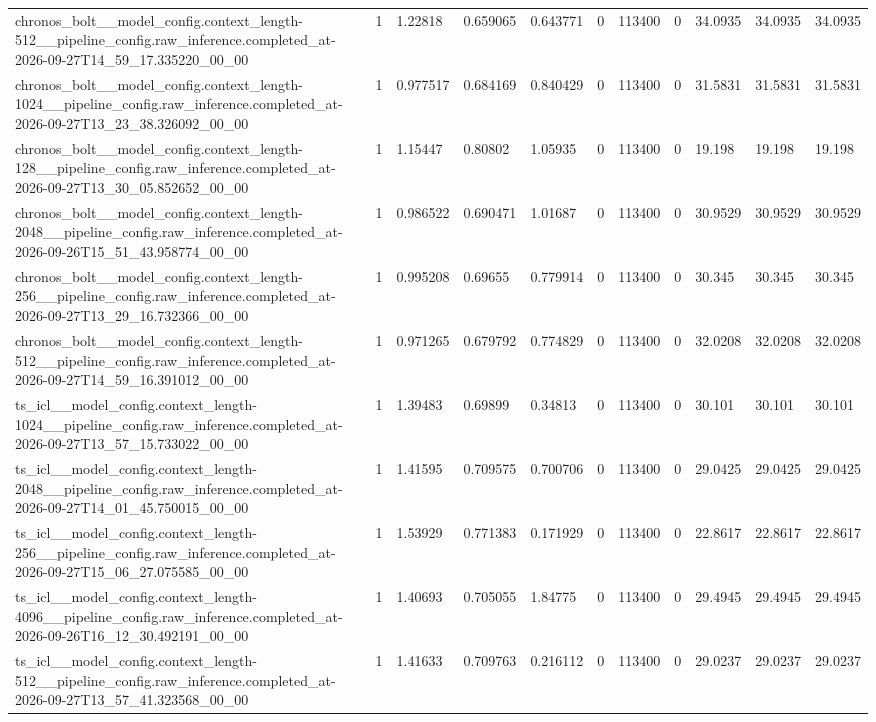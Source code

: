 \begin{tabular}{lllllllllll}
chronos\_bolt\_\_model\_config.context\_length-512\_\_pipeline\_config.raw\_inference.completed\_at-2026-09-27T14\_59\_17.335220\_00\_00 & 1 & 1.22818 & 0.659065 & 0.643771 & 0 & 113400 & 0 & 34.0935 & 34.0935 & 34.0935 \\
chronos\_bolt\_\_model\_config.context\_length-1024\_\_pipeline\_config.raw\_inference.completed\_at-2026-09-27T13\_23\_38.326092\_00\_00 & 1 & 0.977517 & 0.684169 & 0.840429 & 0 & 113400 & 0 & 31.5831 & 31.5831 & 31.5831 \\
chronos\_bolt\_\_model\_config.context\_length-128\_\_pipeline\_config.raw\_inference.completed\_at-2026-09-27T13\_30\_05.852652\_00\_00 & 1 & 1.15447 & 0.80802 & 1.05935 & 0 & 113400 & 0 & 19.198 & 19.198 & 19.198 \\
chronos\_bolt\_\_model\_config.context\_length-2048\_\_pipeline\_config.raw\_inference.completed\_at-2026-09-26T15\_51\_43.958774\_00\_00 & 1 & 0.986522 & 0.690471 & 1.01687 & 0 & 113400 & 0 & 30.9529 & 30.9529 & 30.9529 \\
chronos\_bolt\_\_model\_config.context\_length-256\_\_pipeline\_config.raw\_inference.completed\_at-2026-09-27T13\_29\_16.732366\_00\_00 & 1 & 0.995208 & 0.69655 & 0.779914 & 0 & 113400 & 0 & 30.345 & 30.345 & 30.345 \\
chronos\_bolt\_\_model\_config.context\_length-512\_\_pipeline\_config.raw\_inference.completed\_at-2026-09-27T14\_59\_16.391012\_00\_00 & 1 & 0.971265 & 0.679792 & 0.774829 & 0 & 113400 & 0 & 32.0208 & 32.0208 & 32.0208 \\
ts\_icl\_\_model\_config.context\_length-1024\_\_pipeline\_config.raw\_inference.completed\_at-2026-09-27T13\_57\_15.733022\_00\_00 & 1 & 1.39483 & 0.69899 & 0.34813 & 0 & 113400 & 0 & 30.101 & 30.101 & 30.101 \\
ts\_icl\_\_model\_config.context\_length-2048\_\_pipeline\_config.raw\_inference.completed\_at-2026-09-27T14\_01\_45.750015\_00\_00 & 1 & 1.41595 & 0.709575 & 0.700706 & 0 & 113400 & 0 & 29.0425 & 29.0425 & 29.0425 \\
ts\_icl\_\_model\_config.context\_length-256\_\_pipeline\_config.raw\_inference.completed\_at-2026-09-27T15\_06\_27.075585\_00\_00 & 1 & 1.53929 & 0.771383 & 0.171929 & 0 & 113400 & 0 & 22.8617 & 22.8617 & 22.8617 \\
ts\_icl\_\_model\_config.context\_length-4096\_\_pipeline\_config.raw\_inference.completed\_at-2026-09-26T16\_12\_30.492191\_00\_00 & 1 & 1.40693 & 0.705055 & 1.84775 & 0 & 113400 & 0 & 29.4945 & 29.4945 & 29.4945 \\
ts\_icl\_\_model\_config.context\_length-512\_\_pipeline\_config.raw\_inference.completed\_at-2026-09-27T13\_57\_41.323568\_00\_00 & 1 & 1.41633 & 0.709763 & 0.216112 & 0 & 113400 & 0 & 29.0237 & 29.0237 & 29.0237 \\

\end{tabular}
